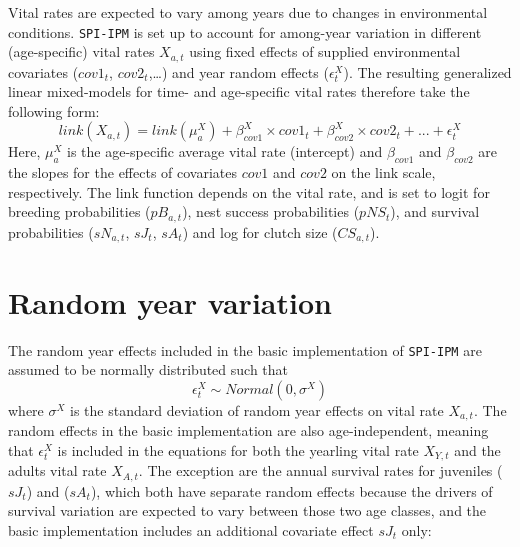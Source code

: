 \documentclass[
]{book}
\begin{document}
Vital rates are expected to vary among years due to changes in environmental
conditions. \texttt{SPI-IPM} is set up to account for among-year variation in
different (age-specific) vital rates \(X_{a,t}\) using fixed effects of
supplied environmental covariates (\(cov1_t\), \(cov2_t\),\ldots) and year random effects (\(\epsilon_t^X\)). The resulting generalized linear
mixed-models for time- and age-specific vital rates therefore take the following
form:
\begin{equation}
  link(X_{a,t}) = link(\mu_a^X) + \beta_{cov1}^X\times cov1_t + \beta_{cov2}^X\times cov2_t + ... + \epsilon_t^X
\end{equation}
Here, \(\mu_a^X\) is the age-specific average vital rate (intercept) and \(\beta_{cov1}\)
and \(\beta_{cov2}\) are the slopes for the effects of covariates \(cov1\) and \(cov2\)
on the link scale, respectively.
The link function depends on the vital rate, and is set to logit for breeding
probabilities (\(pB_{a,t}\)), nest success probabilities (\(pNS_t\)), and survival
probabilities (\(sN_{a,t}\), \(sJ_t\), \(sA_t\)) and log for clutch size (\(CS_{a,t}\)).

\hypertarget{random-year-variation}{%
\section{Random year variation}\label{random-year-variation}}

The random year effects included in the basic implementation of \texttt{SPI-IPM} are
assumed to be normally distributed such that
\begin{equation}
  \epsilon_{t}^X \sim Normal(0, \sigma^X)
\end{equation}
where \(\sigma^X\) is the standard deviation of random year effects on vital rate
\(X_{a,t}\).
The random effects in the basic implementation are also age-independent, meaning
that \(\epsilon_t^X\) is included in the equations for both the yearling vital
rate \(X_{Y,t}\) and the adults vital rate \(X_{A,t}\). The exception are the annual
survival rates for juveniles (\(sJ_t\)) and (\(sA_t\)), which both have separate
random effects because the drivers of survival variation are expected to vary
between those two age classes, and the basic implementation includes an
additional covariate effect \(sJ_t\) only:
\end{document}
